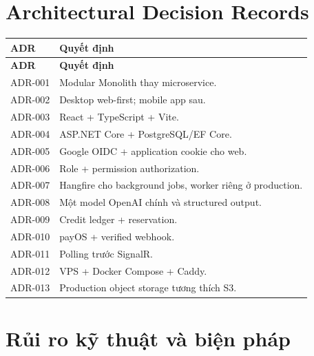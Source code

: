 \documentclass[11pt,a4paper]{article}
\begin{document}
\section{Architectural Decision Records}

\begin{longtable}{|P{0.18\textwidth}|P{0.66\textwidth}|}
\hline
\textbf{ADR} & \textbf{Quyết định} \\ \hline
\endfirsthead
\hline
\textbf{ADR} & \textbf{Quyết định} \\ \hline
\endhead
ADR-001 & Modular Monolith thay microservice. \\ \hline
ADR-002 & Desktop web-first; mobile app sau. \\ \hline
ADR-003 & React + TypeScript + Vite. \\ \hline
ADR-004 & ASP.NET Core + PostgreSQL/EF Core. \\ \hline
ADR-005 & Google OIDC + application cookie cho web. \\ \hline
ADR-006 & Role + permission authorization. \\ \hline
ADR-007 & Hangfire cho background jobs, worker riêng ở production. \\ \hline
ADR-008 & Một model OpenAI chính và structured output. \\ \hline
ADR-009 & Credit ledger + reservation. \\ \hline
ADR-010 & payOS + verified webhook. \\ \hline
ADR-011 & Polling trước SignalR. \\ \hline
ADR-012 & VPS + Docker Compose + Caddy. \\ \hline
ADR-013 & Production object storage tương thích S3. \\ \hline
\end{longtable}

\section{Rủi ro kỹ thuật và biện pháp}
\end{document}
